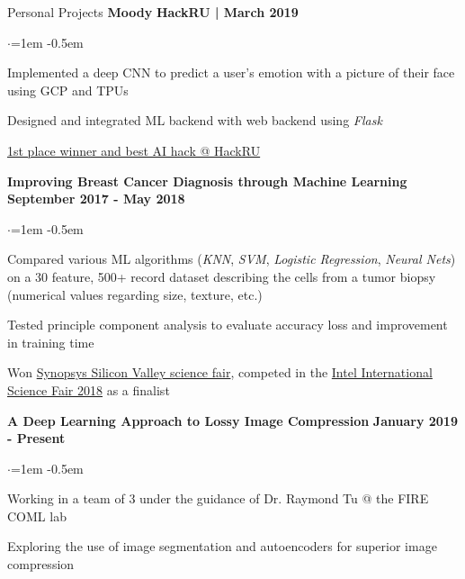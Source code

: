 \documentclass[margin,centered]{resume} %
\begin{document}
\begin{rSection}{Personal Projects}
{\bf Moody}  \hfill {\bf HackRU | March 2019}
 \begin{list}{$\cdot$}{\leftmargin=1em} %
   \itemsep -0.5em \vspace{-0.5em} %
	\item 
		Implemented a deep CNN to predict a user’s emotion with a picture of their face using GCP and TPUs
	\item
		Designed and integrated ML backend with web backend using \textit{Flask}
	\item
		\underline{1st place winner and best AI hack @ HackRU}
  \end{list}

{\bf Improving Breast Cancer Diagnosis through Machine Learning} \hfill {\bf September 2017 - May 2018}
 \begin{list}{$\cdot$}{\leftmargin=1em} %
   \itemsep -0.5em \vspace{-0.5em} %
	\item 
		Compared various ML algorithms (\textit{KNN}, \textit{SVM}, \textit{Logistic Regression}, \textit{Neural Nets}) on a 30 feature, 500+ record dataset describing the cells from a tumor biopsy (numerical values regarding size, texture, etc.)
	\item
		Tested principle component analysis to evaluate accuracy loss and improvement in training time
	\item
		Won \underline{Synopsys Silicon Valley science fair}, competed in the \underline{Intel International Science Fair 2018} as a finalist
  \end{list}

{\bf A Deep Learning Approach to Lossy Image Compression} \hfill {\bf January 2019 - Present}
 \begin{list}{$\cdot$}{\leftmargin=1em} %
   \itemsep -0.5em \vspace{-0.5em} %
		\item Working in a team of 3 under the guidance of Dr. Raymond Tu @ the FIRE COML lab
		\item Exploring the use of image segmentation and autoencoders for superior image compression
  \end{list}


\end{rSection}
\end{document}
